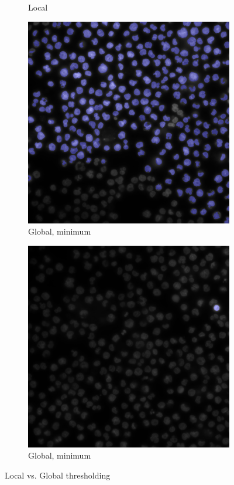 \begin{figure}[ht]
\begin{subfigure}[b]{0.5\linewidth}
      \caption{Local} 
      \label{fig7:b} 
      \vspace{4ex}
    \end{subfigure} 
    \begin{subfigure}[b]{0.5\linewidth}
      \centering
      \includegraphics[width=0.75\linewidth]{bilder/difficult-lightning/gradient_min.png} 
      \caption{Global, minimum} 
      \label{fig7:c} 
    \end{subfigure}%
    \begin{subfigure}[b]{0.5\linewidth}
      \centering
      \includegraphics[width=0.75\linewidth]{bilder/difficult-lightning/point_min.png} 
      \caption{Global, minimum} 
      \label{fig7:d} 
    \end{subfigure} 
    \caption{Local vs. Global thresholding}
    \label{fig7} 
  \end{figure}